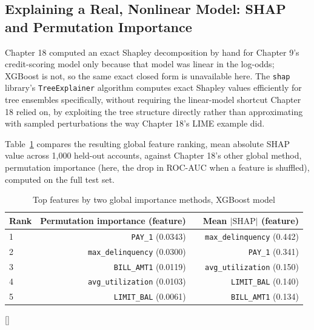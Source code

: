 \documentclass[../ai_in_finance]{subfiles}
\begin{document}
\subsection{Explaining a Real, Nonlinear Model: SHAP and Permutation Importance}
\label{sec:capstone-explain}

Chapter 18 computed an exact Shapley decomposition by hand for Chapter 9's credit-scoring model only because that model was linear in the log-odds; XGBoost is not, so the same exact closed form is unavailable here. The \texttt{shap} library's \texttt{TreeExplainer} algorithm computes exact Shapley values efficiently for tree ensembles specifically, without requiring the linear-model shortcut Chapter 18 relied on, by exploiting the tree structure directly rather than approximating with sampled perturbations the way Chapter 18's LIME example did.

Table~\ref{tab:capstone_importance} compares the resulting global feature ranking, mean absolute SHAP value across 1,000 held-out accounts, against Chapter 18's other global method, permutation importance (here, the drop in ROC-AUC when a feature is shuffled), computed on the full test set.

\begin{table}[htbp]
\centering
\begin{lrbox}{\bookmeasuredbox}
\begin{tabular}{lrlr}
\toprule
Rank & Permutation importance (feature) & & Mean $|\text{SHAP}|$ (feature) \\
\midrule
1 & \texttt{PAY\_1} (0.0343) & & \texttt{max\_\allowbreak delinquency} (0.442) \\
2 & \texttt{max\_\allowbreak delinquency} (0.0300) & & \texttt{PAY\_1} (0.341) \\
3 & \texttt{BILL\_AMT1} (0.0119) & & \texttt{avg\_utilization} (0.150) \\
4 & \texttt{avg\_utilization} (0.0103) & & \texttt{LIMIT\_BAL} (0.140) \\
5 & \texttt{LIMIT\_BAL} (0.0061) & & \texttt{BILL\_AMT1} (0.134) \\
\bottomrule
\end{tabular}
\end{lrbox}
\ifdim\wd\bookmeasuredbox<0.65\linewidth
\setlength{\bookcapwidth}{0.65\linewidth}
\else
\setlength{\bookcapwidth}{\wd\bookmeasuredbox}
\fi
{}[\bookcapwidth]{
\usebox{\bookmeasuredbox}
}{
\caption{Top features by two global importance methods, XGBoost model}
\label{tab:capstone_importance}
}
\end{table}
\end{document}
